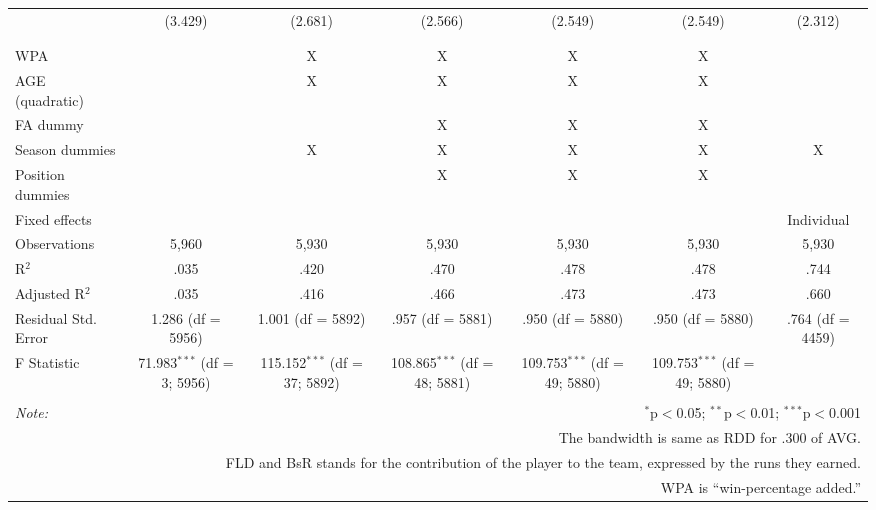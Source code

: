 \begin{table}[H]
\begin{tabular}{@{\extracolsep{-10pt}}lcccccc}
  & (3.429) & (2.681) & (2.566) & (2.549) & (2.549) & (2.312) \\
  & & & & & & \\
\hline \\[-1.8ex]
WPA &  & X & X & X & X &  \\
AGE (quadratic) &  & X & X & X & X &  \\
FA dummy &  &  & X & X & X &  \\
Season dummies &  & X & X & X & X & X \\
Position dummies &  &  & X & X & X &  \\
Fixed effects &  &  &  &  &  & Individual \\
Observations & 5,960 & 5,930 & 5,930 & 5,930 & 5,930 & 5,930 \\
R$^{2}$ & .035 & .420 & .470 & .478 & .478 & .744 \\
Adjusted R$^{2}$ & .035 & .416 & .466 & .473 & .473 & .660 \\
Residual Std. Error & 1.286 (df = 5956) & 1.001 (df = 5892) & .957 (df = 5881) & .950 (df = 5880) & .950 (df = 5880) & .764 (df = 4459) \\
F Statistic & 71.983$^{***}$ (df = 3; 5956) & 115.152$^{***}$ (df = 37; 5892) & 108.865$^{***}$ (df = 48; 5881) & 109.753$^{***}$ (df = 49; 5880) & 109.753$^{***}$ (df = 49; 5880) &  \\
\hline
\hline \\[-1.8ex]
\textit{Note:}  & \multicolumn{6}{r}{$^{*}$p$<$0.05; $^{**}$p$<$0.01; $^{***}$p$<$0.001} \\
& \multicolumn{6}{r}{The bandwidth is same as RDD for .300 of AVG.} \\
& \multicolumn{6}{r}{FLD and BsR stands for the contribution of the player to the team, expressed by the runs they earned.} \\
& \multicolumn{6}{r}{WPA is ``win-percentage added.''} \\
\end{tabular}
\end{table}
